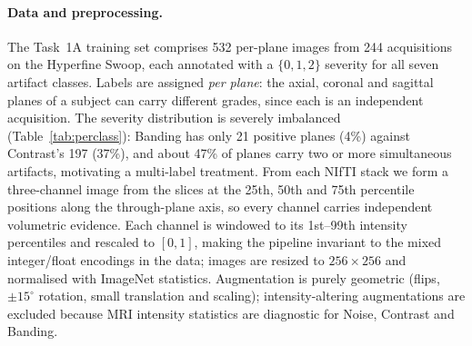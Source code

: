 \documentclass[runningheads]{llncs}
\begin{document}
\paragraph{Data and preprocessing.}
The Task~1A training set comprises 532 per-plane images from 244 acquisitions on
the Hyperfine Swoop, each annotated with a $\{0,1,2\}$ severity for all seven
artifact classes. Labels are assigned \emph{per plane}: the axial, coronal and
sagittal planes of a subject can carry different grades, since each is an
independent acquisition. The severity distribution is severely imbalanced
(Table~\ref{tab:perclass}): Banding has only 21 positive planes (4\%) against
Contrast's 197 (37\%), and about 47\% of planes carry two or more simultaneous
artifacts, motivating a multi-label treatment. From each NIfTI stack we form a
three-channel image from the slices at the 25th, 50th and 75th percentile
positions along the through-plane axis, so every channel carries independent
volumetric evidence. Each channel is windowed to its 1st--99th intensity
percentiles and rescaled to $[0,1]$, making the pipeline invariant to the mixed
integer/float encodings in the data; images are resized to $256\times256$ and
normalised with ImageNet statistics. Augmentation is purely geometric
(flips, $\pm15^\circ$ rotation, small translation and scaling); intensity-altering
augmentations are excluded because MRI intensity statistics are diagnostic for
Noise, Contrast and Banding.
\end{document}
